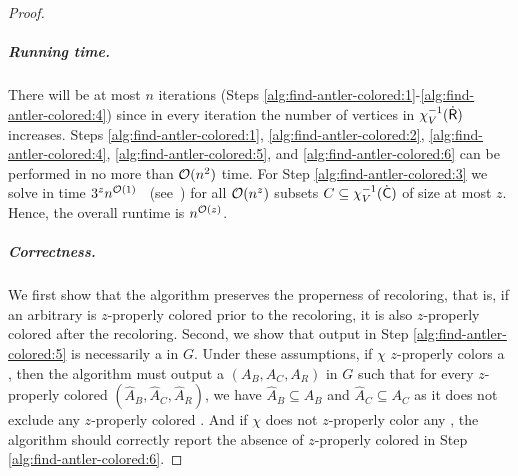 \begin{proof}

  \subparagraph*{Running time.}
  There will be at most $n$ iterations (Steps \ref{alg:find-antler-colored:1}-\ref{alg:find-antler-colored:4}) since in every iteration the number of vertices in $\chi_V^{-1}(\mathsf{\dot{R}})$ increases.
  Steps \ref{alg:find-antler-colored:1}, \ref{alg:find-antler-colored:2}, \ref{alg:find-antler-colored:4}, \ref{alg:find-antler-colored:5}, and \ref{alg:find-antler-colored:6}
  can be performed in no more than $\mathcal{O}(n^2)$ time.
  For Step \ref{alg:find-antler-colored:3} we solve \PrbOCTLong
  in time $3^z n^{\mathcal{O}(1)}$~\cite{ReedSV04} (see~\cite[Thm. 4.17]{CyganFKLMPPS15}) for all $\mathcal{O}(n^z)$ subsets $C \subseteq \chi_V^{-1}(\mathsf{\dot{C}})$ of size at most $z$.
  Hence, the overall runtime is $n^{\mathcal{O}(z)}$.

  \subparagraph*{Correctness.}
  We first show that the algorithm preserves the properness of recoloring,
  that is, if an arbitrary \zocc is $z$-properly colored prior to the recoloring,
  it is also $z$-properly colored after the recoloring.
  Second, we show that output in Step \ref{alg:find-antler-colored:5} is necessarily a \zocc in $G$.
  Under these assumptions, if $\chi$ $z$-properly colors a \zocc, then the algorithm must output
  a \zocc $(A_B,A_C,A_R)$ in $G$ such that for every $z$-properly colored \occ $(\hat{A}_B, \hat{A}_C, \hat{A}_R)$,
  we have $\hat{A}_B \subseteq A_B$ and $\hat{A}_C \subseteq A_C$ as it does not exclude any 
  $z$-properly colored \zoccs.
  And if $\chi$ does not $z$-properly color any \zoccs, the algorithm should correctly report the absence
  of $z$-properly colored \zoccs in Step \ref{alg:find-antler-colored:6}.


\end{proof}

